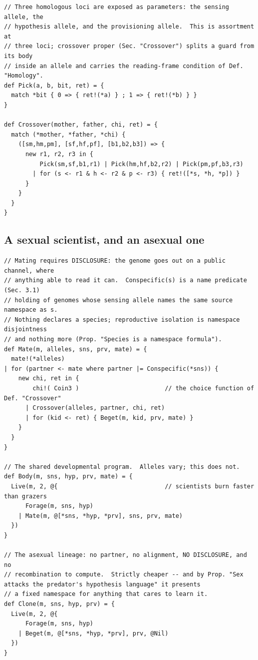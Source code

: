 \begin{lstlisting}
// Three homologous loci are exposed as parameters: the sensing allele, the
// hypothesis allele, and the provisioning allele.  This is assortment at
// three loci; crossover proper (Sec. "Crossover") splits a guard from its body
// inside an allele and carries the reading-frame condition of Def. "Homology".
def Pick(a, b, bit, ret) = {
  match *bit { 0 => { ret!(*a) } ; 1 => { ret!(*b) } }
}

def Crossover(mother, father, chi, ret) = {
  match (*mother, *father, *chi) {
    ([sm,hm,pm], [sf,hf,pf], [b1,b2,b3]) => {
      new r1, r2, r3 in {
          Pick(sm,sf,b1,r1) | Pick(hm,hf,b2,r2) | Pick(pm,pf,b3,r3)
        | for (s <- r1 & h <- r2 & p <- r3) { ret!([*s, *h, *p]) }
      }
    }
  }
}
\end{lstlisting}

\subsection{A sexual scientist, and an asexual one}\label{sci:S19.6}

\begin{lstlisting}
// Mating requires DISCLOSURE: the genome goes out on a public channel, where
// anything able to read it can.  Conspecific(s) is a name predicate (Sec. 3.1)
// holding of genomes whose sensing allele names the same source namespace as s.
// Nothing declares a species; reproductive isolation is namespace disjointness
// and nothing more (Prop. "Species is a namespace formula").
def Mate(m, alleles, sns, prv, mate) = {
  mate!(*alleles)
| for (partner <- mate where partner |= Conspecific(*sns)) {
    new chi, ret in {
        chi!( Coin3 )                        // the choice function of Def. "Crossover"
      | Crossover(alleles, partner, chi, ret)
      | for (kid <- ret) { Beget(m, kid, prv, mate) }
    }
  }
}

// The shared developmental program.  Alleles vary; this does not.
def Body(m, sns, hyp, prv, mate) = {
  Live(m, 2, @{                              // scientists burn faster than grazers
      Forage(m, sns, hyp)
    | Mate(m, @[*sns, *hyp, *prv], sns, prv, mate)
  })
}

// The asexual lineage: no partner, no alignment, NO DISCLOSURE, and no
// recombination to compute.  Strictly cheaper -- and by Prop. "Sex attacks the predator's hypothesis language" it presents
// a fixed namespace for anything that cares to learn it.
def Clone(m, sns, hyp, prv) = {
  Live(m, 2, @{
      Forage(m, sns, hyp)
    | Beget(m, @[*sns, *hyp, *prv], prv, @Nil)
  })
}
\end{lstlisting}

